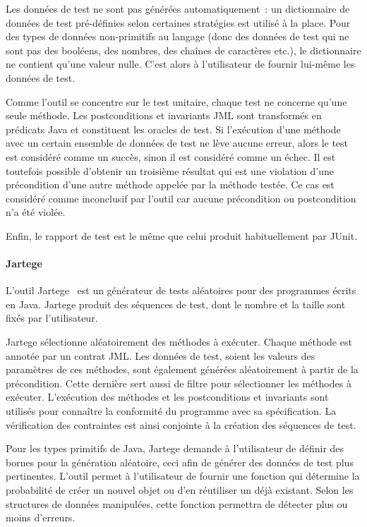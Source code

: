 Les données de test ne sont pas générées automatiquement~: un dictionnaire de
données de test pré-définies selon certaines stratégies est utilisé à la place.
Pour des types de données non-primitifs au langage (donc des données de test
qui ne sont pas des booléens, des nombres, des chaînes de caractères etc.), le
dictionnaire ne contient qu'une valeur nulle. C'est alors à l'utilisateur de
fournir lui-même les données de test.

Comme l'outil se concentre sur le test unitaire, chaque test ne concerne qu'une
seule méthode. Les postconditions et invariants JML sont transformés en
prédicats Java et constituent les oracles de test. Si l'exécution d'une méthode
avec un certain ensemble de données de test ne lève aucune erreur, alors le
test est considéré comme un succès, sinon il est considéré comme un échec. Il
est toutefois possible d'obtenir un troisième résultat qui est une violation
d'une précondition d'une autre méthode appelée par la méthode testée.  Ce cas
est considéré comme inconclusif par l'outil car aucune précondition ou
postcondition n'a été violée.

Enfin, le rapport de test est le même que celui produit habituellement par
JUnit.

\paragraph{Jartege} L'outil Jartege~ est un générateur de tests
aléatoires pour des programmes écrits en Java. Jartege produit des séquences de
test, dont le nombre et la taille sont fixés par l'utilisateur.

Jartege sélectionne aléatoirement des méthodes à exécuter. Chaque méthode est
annotée par un contrat JML. Les données de test, soient les valeurs des
paramètres de ces méthodes, sont également générées aléatoirement à partir de la
précondition. Cette dernière sert aussi de filtre pour sélectionner les méthodes
à exécuter. L'exécution des méthodes et les postconditions et invariants sont
utilisés pour connaître la conformité du programme avec sa spécification. La
vérification des contraintes est ainsi conjointe à la création des séquences de
test.

Pour les types primitifs de Java, Jartege demande à l'utilisateur de définir des
bornes pour la génération aléatoire, ceci afin de générer des données de test
plus pertinentes. L'outil permet à l'utilisateur de fournir une fonction qui
détermine la probabilité de créer un nouvel objet ou d'en réutiliser un déjà
existant. Selon les structures de données manipulées, cette fonction permettra
de détecter plus ou moins d'erreurs.

